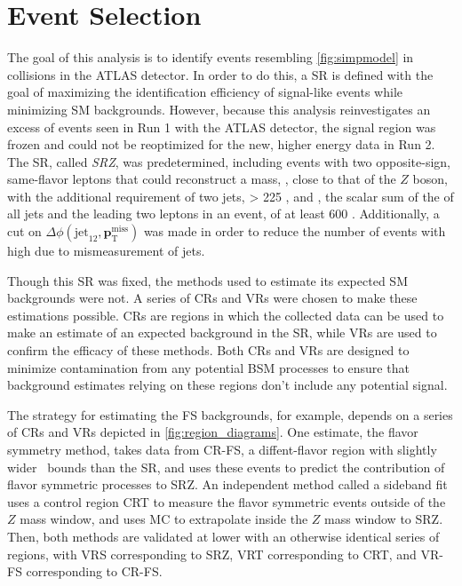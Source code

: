 
\chapter{Event Selection} %
\label{ch:eventsel} 

The goal of this analysis is to identify events resembling \autoref{fig:simpmodel} in collisions in the ATLAS detector. In order to do this, a \acf{SR} is defined with the goal of maximizing the identification efficiency of signal-like events while minimizing \ac{SM} backgrounds. However, because this analysis reinvestigates an excess of events seen in Run 1 with the ATLAS detector, the signal region was frozen and could not be reoptimized for the new, higher energy data in Run 2. The \ac{SR}, called \textit{SRZ}, was predetermined, including events with two opposite-sign, same-flavor leptons that could reconstruct a mass, \mll, close to that of the $Z$ boson, with the additional requirement of two jets, \met > 225 \gev, and \HT, the scalar sum of the \pt of all jets and the leading two leptons in an event, of at least 600 \gev. Additionally, a cut on $\Delta\phi(\text{jet}_{12},{\boldsymbol p}_{\mathrm{T}}^{\mathrm{miss}})$ was made in order to reduce the number of events with high \met due to mismeasurement of jets. 

Though this \ac{SR} was fixed, the methods used to estimate its expected \ac{SM} backgrounds were not. A series of \acfp{CR} and \acfp{VR} were chosen to make these estimations possible. \acp{CR} are regions in which the collected data can be used to make an estimate of an expected background in the \ac{SR}, while \acp{VR} are used to confirm the efficacy of these methods. Both \acp{CR} and \acp{VR} are designed to minimize contamination from any potential \ac{BSM} processes to ensure that background estimates relying on these regions don't include any potential signal. 

The strategy for estimating the \ac{FS} backgrounds, for example, depends on a series of \acp{CR} and \acp{VR} depicted in \autoref{fig:region_diagrams}. One estimate, the flavor symmetry method, takes data from CR-FS, a diffent-flavor region with slightly wider \mll~bounds than the \ac{SR}, and uses these events to predict the contribution of flavor symmetric processes to SRZ. An independent method called a sideband fit uses a control region CRT to measure the flavor symmetric events outside of the $Z$ mass window, and uses \ac{MC} to extrapolate inside the $Z$ mass window to SRZ. Then, both methods are validated at lower \met with an otherwise identical series of regions, with VRS corresponding to SRZ, VRT corresponding to CRT, and VR-FS corresponding to CR-FS. 

